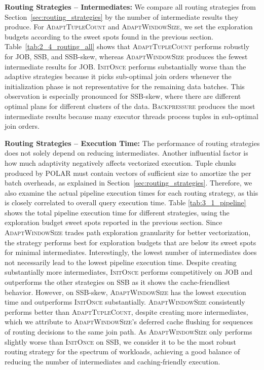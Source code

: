 \textbf{Routing Strategies -- Intermediates:} We compare all routing strategies from Section~\ref{sec:routing_strategies} by the number of intermediate results they produce. For \textsc{AdaptTupleCount} and \textsc{AdaptWindowSize}, we set the exploration budgets according to the sweet spots found in the previous section. Table~\ref{tab:2_4_routing_all} shows that \textsc{AdaptTupleCount} performs robustly for JOB, SSB, and SSB-skew, whereas \textsc{AdaptWindowSize} produces the fewest intermediate results for JOB. \textsc{InitOnce} performs substantially worse than the adaptive strategies because it picks sub-optimal join orders whenever the initialization phase is not representative for the remaining data batches. This observation is especially pronounced for SSB-skew, where there are different optimal plans for different clusters of the data. \textsc{Backpressure} produces the most intermediate results because many executor threads process tuples in sub-optimal join orders.



\textbf{Routing Strategies -- Execution Time:} The performance of routing strategies does not solely depend on reducing intermediates. Another influential factor is how much adaptivity negatively affects vectorized execution. Tuple chunks produced by POLAR must contain vectors of sufficient size to amortize the per batch overheads, as explained in Section~\ref{sec:routing_strategies}. Therefore, we also examine the actual pipeline execution times for each routing strategy, as this is closely correlated to overall query execution time. Table \ref{tab:3_1_pipeline} shows the total pipeline execution time for different strategies, using the exploration budget sweet spots reported in the previous section. Since \textsc{AdaptWindowSize} trades path exploration granularity for better vectorization, the strategy performs best for exploration budgets that are below its sweet spots for minimal intermediates. Interestingly, the lowest number of intermediates does not necessarily lead to the lowest pipeline execution time. Despite creating substantially more intermediates, \textsc{InitOnce} performs competitively on JOB and outperforms the other strategies on SSB as it shows the cache-friendliest behavior. However, on SSB-skew, \textsc{AdaptWindowSize} has the lowest execution time and outperforms \textsc{InitOnce} substantially. \textsc{AdaptWindowSize} consistently performs better than \textsc{AdaptTupleCount}, despite creating more intermediates, which we attribute to \textsc{AdaptWindowSize}’s deferred cache flushing for sequences of routing decisions to the same join path. As \textsc{AdaptWindowSize} only performs slightly worse than \textsc{InitOnce} on SSB, we consider it to be the most robust routing strategy for the spectrum of workloads, achieving a good balance of reducing the number of intermediates and caching-friendly execution.

